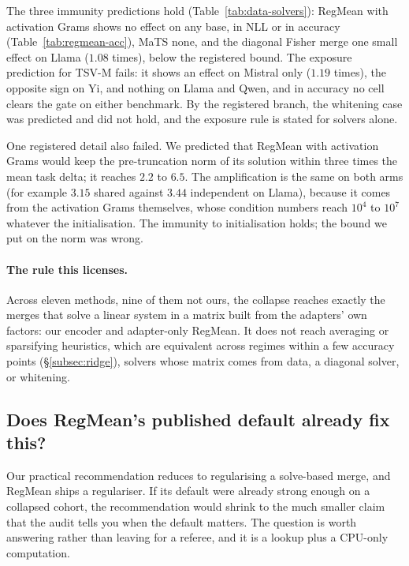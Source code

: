 The three immunity predictions hold (Table~\ref{tab:data-solvers}): RegMean
with activation Grams shows no effect on any base, in NLL or in accuracy
(Table~\ref{tab:regmean-acc}), MaTS none, and the diagonal
Fisher merge one small effect on Llama ($1.08$ times), below the registered
bound. The exposure prediction for TSV-M fails: it shows an effect on Mistral
only ($1.19$ times), the opposite sign on Yi, and nothing on Llama and Qwen, and
in accuracy no cell clears the gate on either benchmark. By the registered
branch, the whitening case was predicted and did not hold, and the exposure
rule is stated for solvers alone.

One registered detail also failed. We predicted that RegMean with activation
Grams would keep the pre-truncation norm of its solution within three times the
mean task delta; it reaches $2.2$ to $6.5$. The amplification is the same on
both arms (for example $3.15$ shared against $3.44$ independent on Llama),
because it comes from the activation Grams themselves, whose condition numbers
reach $10^{4}$ to $10^{7}$ whatever the initialisation. The immunity to
initialisation holds; the bound we put on the norm was wrong.

\paragraph{The rule this licenses.} Across eleven methods, nine of them not ours,
the collapse reaches exactly the merges that solve a linear system in a matrix
built from the adapters' own factors: our encoder and adapter-only RegMean.
It does not reach averaging or sparsifying heuristics, which are equivalent
across regimes within a few accuracy points (\S\ref{subsec:ridge}),
solvers whose matrix comes from data, a diagonal solver, or whitening.

\subsection{Does RegMean's published default already fix this?}
\label{subsec:regmean-default}

Our practical recommendation reduces to regularising a solve-based merge, and
RegMean ships a regulariser. If its default were already strong enough on a
collapsed cohort, the recommendation would shrink to the much smaller claim
that the audit tells you when the default matters. The question is worth
answering rather than leaving for a referee, and it is a lookup plus a
CPU-only computation.

